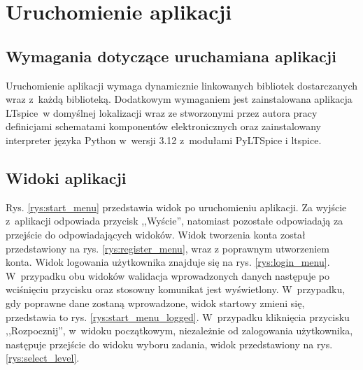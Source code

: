 \documentclass[12pt, a4paper]{article} %
\begin{document}


\newpage


\newpage




\clearpage
\section{Uruchomienie aplikacji}
\subsection{Wymagania dotyczące uruchamiana aplikacji}
Uruchomienie aplikacji wymaga dynamicznie linkowanych bibliotek dostarczanych wraz z~każdą biblioteką. Dodatkowym wymaganiem jest zainstalowana aplikacja LTspice~w domyślnej lokalizacji wraz ze stworzonymi przez autora pracy definicjami schematami komponentów elektronicznych oraz zainstalowany interpreter języka Python w~wersji 3.12 z~modułami PyLTSpice i ltspice.

\subsection{Widoki aplikacji}

Rys. \ref{rys:start_menu} przedstawia widok po uruchomieniu aplikacji. Za wyjście z~aplikacji odpowiada przycisk ,,Wyście'', natomiast pozostałe odpowiadają za przejście do odpowiadających widoków. Widok tworzenia konta został przedstawiony na rys. \ref{rys:register_menu}, wraz z poprawnym utworzeniem konta. Widok logowania użytkownika znajduje się na rys. \ref{rys:login_menu}. W~przypadku obu widoków walidacja wprowadzonych danych następuje po wciśnięciu przycisku oraz stosowny komunikat jest wyświetlony. W~przypadku, gdy poprawne dane zostaną wprowadzone, widok startowy zmieni się, przedstawia to rys. \ref{rys:start_menu_logged}.
W~przypadku kliknięcia przycisku ,,Rozpocznij'', w~widoku początkowym, niezależnie od zalogowania użytkownika, następuje przejście do widoku wyboru zadania, widok przedstawiony na rys. \ref{rys:select_level}.
\end{document}
